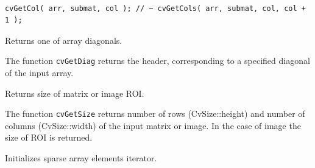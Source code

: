 \begin{lstlisting}

cvGetCol( arr, submat, col ); // ~ cvGetCols( arr, submat, col, col + 1 );

\end{lstlisting}

\label{GetDiag}

Returns one of array diagonals.


\begin{description}
\end{description}

The function \texttt{cvGetDiag} returns the header, corresponding to a specified diagonal of the input array.

\label{GetSize}

Returns size of matrix or image ROI.


\begin{description}
\end{description}

The function \texttt{cvGetSize} returns number of rows (CvSize::height) and number of columns (CvSize::width) of the input matrix or image. In the case of image the size of ROI is returned.


\ifC
{}\label{InitSparseMatIterator}

Initializes sparse array elements iterator.


\begin{description}
\end{description}

